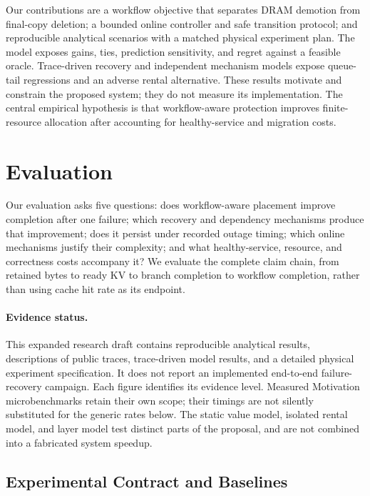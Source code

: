 \documentclass[sigplan,10pt,anonymous,nonacm]{acmart}
\begin{document}
Our contributions are a workflow objective that separates DRAM demotion
from final-copy deletion; a bounded online controller and safe transition
protocol; and reproducible analytical scenarios with a matched physical
experiment plan. The model exposes gains, ties, prediction sensitivity,
and regret against a feasible oracle. Trace-driven recovery and independent
mechanism models expose queue-tail regressions and an adverse rental
alternative. These results
motivate and constrain the proposed
system; they do not measure its implementation. The central empirical
hypothesis is that workflow-aware protection improves finite-resource
allocation after accounting for healthy-service and migration costs.




\section{Evaluation}
\label{sec:evaluation}

Our evaluation asks five questions: does workflow-aware placement improve
completion after one failure; which recovery and dependency mechanisms
produce that improvement; does it persist under recorded outage timing;
which online mechanisms justify their complexity; and what healthy-service,
resource, and correctness costs accompany it? We evaluate the complete
claim chain, from retained bytes to ready KV to branch completion to
workflow completion, rather than using cache hit rate as its endpoint.

\paragraph{Evidence status.}
This expanded research draft contains reproducible analytical results,
descriptions of public traces, trace-driven model results, and a detailed
physical experiment specification. It does not report an implemented
end-to-end failure-recovery campaign. Each figure identifies its evidence
level. Measured Motivation microbenchmarks retain their own scope;
their timings are not silently substituted for the generic rates below.
The static value model, isolated rental model, and layer model test distinct
parts of the proposal, and are not combined into a fabricated system speedup.

\FloatBarrier
\subsection{Experimental Contract and Baselines}
\label{sec:eval-method}
\end{document}
